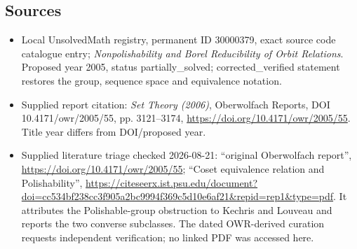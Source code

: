 \documentclass[11pt]{article}
\begin{document}
\subsection{Sources}
\begin{itemize}
\item Local UnsolvedMath registry, permanent ID 30000379, exact source code catalogue entry; \emph{Nonpolishability and Borel Reducibility of Orbit Relations}. Proposed year 2005, status partially\_solved; corrected\_verified statement restores the group, sequence space and equivalence notation.
\item Supplied report citation: \emph{Set Theory (2006)}, Oberwolfach Reports, DOI 10.4171/owr/2005/55, pp. 3121--3174, \url{https://doi.org/10.4171/owr/2005/55}. Title year differs from DOI/proposed year.
\item Supplied literature triage checked 2026-08-21: ``original Oberwolfach report'', \url{https://doi.org/10.4171/owr/2005/55}; ``Coset equivalence relation and Polishability'', \url{https://citeseerx.ist.psu.edu/document?doi=cc534bf238cc3f905a2bc9994f369c5d10e6af21&repid=rep1&type=pdf}. It attributes the Polishable-group obstruction to Kechris and Louveau and reports the two converse subclasses. The dated OWR-derived curation requests independent verification; no linked PDF was accessed here.
\end{itemize}
\end{document}
